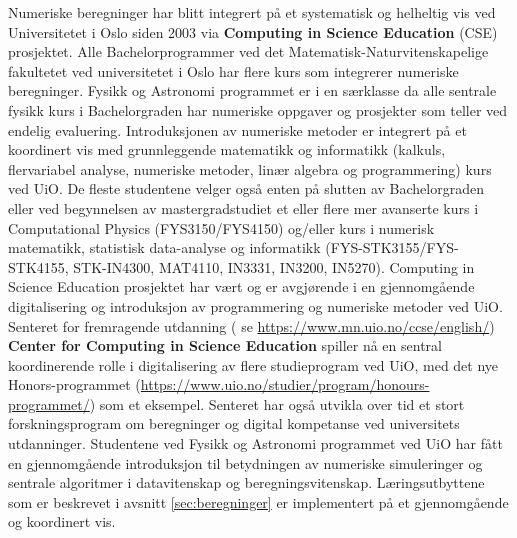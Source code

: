\documentclass{article}
\begin{document}
Numeriske beregninger har blitt integrert på et systematisk og helheltig vis ved Universitetet i Oslo siden 2003 via \textbf{Computing in Science Education} (CSE) prosjektet. 
Alle Bachelorprogrammer ved det Matematisk-Naturvitenskapelige fakultetet ved universitetet i Oslo har flere kurs som integrerer numeriske beregninger. Fysikk og Astronomi programmet er i en særklasse da alle sentrale fysikk kurs i Bachelorgraden har numeriske oppgaver og prosjekter som teller ved endelig evaluering. Introduksjonen av numeriske metoder er integrert på et koordinert vis med grunnleggende matematikk og informatikk (kalkuls, flervariabel analyse, numeriske metoder, linær algebra og programmering) kurs ved UiO. De fleste studentene velger også enten på slutten av Bachelorgraden eller ved begynnelsen av mastergradstudiet et eller flere mer avanserte kurs i Computational Physics (FYS3150/FYS4150) og/eller kurs i numerisk matematikk, statistisk data-analyse og informatikk (FYS-STK3155/FYS-STK4155, STK-IN4300, MAT4110, IN3331, IN3200, IN5270). Computing in Science Education prosjektet har vært og er avgjørende i en gjennomgående digitalisering og introduksjon av programmering og numeriske metoder ved UiO. Senteret for fremragende utdanning ( se \url{https://www.mn.uio.no/ccse/english/}) \textbf{Center for Computing in Science Education} spiller nå en sentral koordinerende rolle i digitalisering av flere studieprogram ved UiO, med det nye Honors-programmet (\url{https://www.uio.no/studier/program/honours-programmet/}) som et eksempel. Senteret har også utvikla over tid et stort forskningsprogram om beregninger og digital kompetanse ved universitets utdanninger. Studentene ved Fysikk og Astronomi programmet ved UiO har fått en gjennomgående introduksjon til betydningen av numeriske simuleringer og sentrale algoritmer i datavitenskap og beregningsvitenskap. Læringsutbyttene som er beskrevet i avsnitt \ref{sec:beregninger} er implementert på et gjennomgående og koordinert vis.
\end{document}

